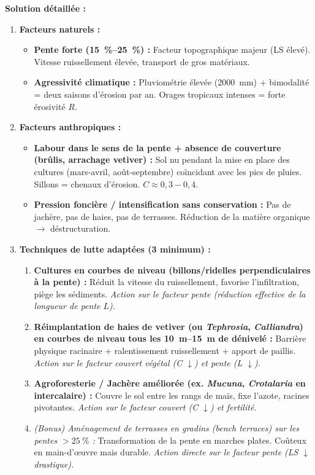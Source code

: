 \documentclass[11pt]{article}
\begin{document}
\begin{exoresolu}
\textbf{Solution détaillée :}
\begin{enumerate}
    \item \textbf{Facteurs naturels :}
        \begin{itemize}
            \item \textbf{Pente forte (\SIrange{15}{25}{\%}) :} Facteur topographique majeur (LS élevé). Vitesse ruissellement élevée, transport de gros matériaux.
            \item \textbf{Agressivité climatique :} Pluviométrie élevée (\SI{2000}{mm}) + bimodalité = deux saisons d'érosion par an. Orages tropicaux intenses = forte érosivité $R$.
        \end{itemize}
    \item \textbf{Facteurs anthropiques :}
        \begin{itemize}
            \item \textbf{Labour dans le sens de la pente + absence de couverture (brûlis, arrachage vetiver) :} Sol nu pendant la mise en place des cultures (mars-avril, août-septembre) coïncidant avec les pics de pluies. Sillons = chenaux d'érosion. $C \approx 0,3-0,4$.
            \item \textbf{Pression foncière / intensification sans conservation :} Pas de jachère, pas de haies, pas de terrasses. Réduction de la matière organique $\rightarrow$ déstructuration.
        \end{itemize}
    \item \textbf{Techniques de lutte adaptées (3 minimum) :}
        \begin{enumerate}
            \item \textbf{Cultures en courbes de niveau (billons/ridelles perpendiculaires à la pente) :} Réduit la vitesse du ruissellement, favorise l'infiltration, piège les sédiments. \emph{Action sur le facteur pente (réduction effective de la longueur de pente $L$).}
            \item \textbf{Réimplantation de haies de vetiver (ou \emph{Tephrosia}, \emph{Calliandra}) en courbes de niveau tous les \SIrange{10}{15}{m} de dénivelé :} Barrière physique racinaire + ralentissement ruissellement + apport de paillis. \emph{Action sur le facteur couvert végétal (C $\downarrow$) et pente (L $\downarrow$).}
            \item \textbf{Agroforesterie / Jachère améliorée (ex. \emph{Mucuna}, \emph{Crotalaria} en intercalaire) :} Couvre le sol entre les rangs de maïs, fixe l'azote, racines pivotantes. \emph{Action sur le facteur couvert (C $\downarrow$) et fertilité.}
            \item \textit{(Bonus) Aménagement de terrasses en gradins (bench terraces) sur les pentes $> \SI{25}{\%}$ :} Transformation de la pente en marches plates. Coûteux en main-d'œuvre mais durable. \emph{Action directe sur le facteur pente (LS $\downarrow$ drastique).}
        \end{enumerate}
\end{enumerate}
\end{exoresolu}
\end{document}
